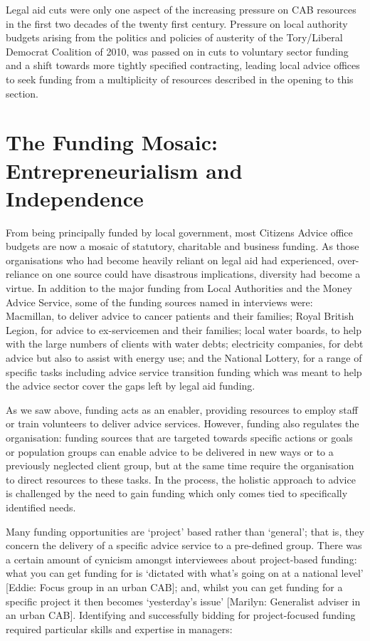Legal aid cuts were only one aspect of the increasing pressure on CAB resources in the first two decades of the twenty first century. Pressure on local authority budgets arising from the politics and policies of austerity of the Tory/Liberal Democrat Coalition of 2010, was passed on in cuts to voluntary sector funding and a shift towards more tightly specified contracting, leading local advice offices to seek funding from a multiplicity of resources described in the opening to this section.

\section{The Funding Mosaic: Entrepreneurialism and Independence} 
From being principally funded by local government, most Citizens Advice office budgets are now a mosaic of statutory, charitable and business funding. As those organisations who had become heavily reliant on legal aid had experienced, over-reliance on one source could have disastrous implications, diversity had become a virtue. In addition to the major funding from Local Authorities and the Money Advice Service, some of the funding sources named in interviews were: Macmillan, to deliver advice to cancer patients and their families; Royal British Legion, for advice to ex-servicemen and their families; local water boards, to help with the large numbers of clients with water debts; electricity companies, for debt advice but also to assist with energy use; and the National Lottery, for a range of specific tasks including advice service transition funding which was meant to help the advice sector cover the gaps left by legal aid funding.
\par
As we saw above, funding acts as an enabler, providing resources to employ staff or train volunteers to deliver advice services. However, funding also regulates the organisation: funding sources that are targeted towards specific actions or goals or population groups can enable advice to be delivered in new ways or to a previously neglected client group, but at the same time require the organisation to direct resources to these tasks. In the process, the holistic approach to advice is challenged by the need to gain funding which only comes tied to specifically identified needs. 
\par
Many funding opportunities are ‘project’ based rather than ‘general’; that is, they concern the delivery of a specific advice service to a pre-defined group. There was a certain amount of cynicism amongst interviewees about project-based funding: what you can get funding for is ‘dictated with what’s going on at a national level’ [Eddie: Focus group in an urban CAB]; and, whilst you can get funding for a specific project it then becomes ‘yesterday’s issue’ [Marilyn: Generalist adviser in an urban CAB]. Identifying and successfully bidding for project-focused funding required particular skills and expertise in managers:
